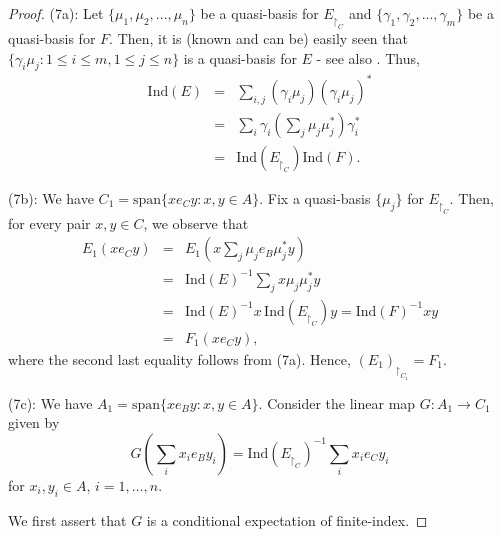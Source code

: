 \documentclass[a4]{amsart}
\numberwithin{equation}{section}
\begin{document}
\begin{proof}
(7a): Let $\{\mu_1, \mu_2,..., \mu_n\}$ be a quasi-basis for $
E_{\restriction_C}$ and $\{\gamma_1,\gamma_2,..., \gamma_m\}$
be a quasi-basis for $F$. Then, it is (known and can be) easily
seen that $\{\gamma_i \mu_j : 1\leq i\leq m , 1 \leq j \leq n\}$ is a
quasi-basis for $E$ - see also \cite[Proposition 1.7.1]{Wat}. Thus,
\begin{eqnarray*}
	\mathrm{Ind}(E) & = & \sum_{i,j} (\gamma_i \mu_j)(\gamma_i \mu_j)^*\\
	& = & \sum_{i} \gamma_i (\sum_{j} \mu_j \mu_j^*) \gamma_i^* \\
        & = & \mathrm{Ind}(E_{\restriction_C}) \mathrm{Ind}(F).
\end{eqnarray*}

(7b): We have $C_1=\mathrm{span}\{xe_C y: x, y \in A\}$.  Fix a
quasi-basis $\{\mu_j\}$ for $E_{\restriction_C}$. Then, for every pair
$x,y\in C$, we observe that
\begin{eqnarray*}
  E_1(xe_Cy) & = & E_1(x \sum_j \mu_j e_B \mu_j^* y)\\
  & = & \mathrm{Ind}(E)^{-1}
\sum_j x \mu_j \mu_j^* y \\
& = & \mathrm{Ind}(E)^{-1}  x\,
\mathrm{Ind}(E_{\restriction_C}) y = \mathrm{Ind}(F)^{-1}xy \\
& = &
F_1(xe_Cy),
\end{eqnarray*}
where the second last equality follows from (7a). Hence, $(E_1)_{\restriction_{C_1}} = F_1$. \smallskip

(7c): We have $A_1=\mathrm{span}\{xe_B y: x, y \in A\}$. Consider the linear  map $G: A_1 \to C_1$  given by
\[
G(\sum_ix_ie_By_i)= \mathrm{Ind}(E_{\restriction_{C}})^{-1}\sum_i x_ie_C y_i
\]
for $x_i, y_i \in A$, $i=1, \ldots, n$. 

We first assert that $G$ is a  conditional expectation of finite-index. 


\end{proof}
\end{document}
